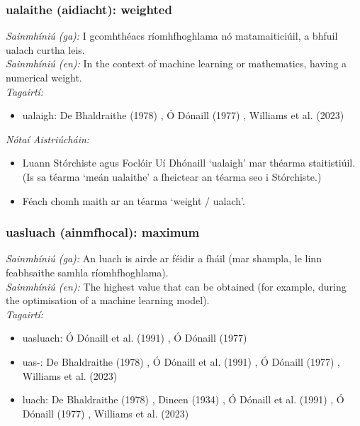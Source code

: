 \documentclass{article}
\begin{document}
\subsubsection*{ualaithe (aidiacht): weighted}
 \noindent \textit{Sainmhíniú (ga):} I gcomhthéacs ríomhfhoghlama nó matamaiticiúil, a bhfuil ualach curtha leis.
\\
 \noindent \textit{Sainmhíniú (en):} In the context of machine learning or mathematics, having a numerical weight.
\\
 \noindent \textit{Tagairtí:}
\begin{itemize}
	\item ualaigh: De Bhaldraithe (1978) \cite{de-bhaldraithe}, Ó Dónaill (1977) \cite{odonaill}, Williams et al. (2023) \cite{storchiste}
\end{itemize}

 \noindent \textit{Nótaí Aistriúcháin:}
\begin{itemize}
	\item Luann Stórchiste agus Foclóir Uí Dhónaill `ualaigh' mar théarma staitistiúil. (Is sa téarma `meán ualaithe' a fheictear an téarma seo i Stórchiste.)
	\item Féach chomh maith ar an téarma `weight / ualach'.
\end{itemize}


\subsubsection*{uasluach (ainmfhocal): maximum}
 \noindent \textit{Sainmhíniú (ga):} An luach is airde ar féidir a fháil (mar shampla, le linn feabhsaithe samhla ríomhfhoghlama).
\\
 \noindent \textit{Sainmhíniú (en):} The highest value that can be obtained (for example, during the optimisation of a machine learning model).
\\
 \noindent \textit{Tagairtí:}
\begin{itemize}
	\item uasluach: Ó Dónaill et al. (1991) \cite{focloir-beag}, Ó Dónaill (1977) \cite{odonaill}
	\item uas-: De Bhaldraithe (1978) \cite{de-bhaldraithe}, Ó Dónaill et al. (1991) \cite{focloir-beag}, Ó Dónaill (1977) \cite{odonaill}, Williams et al. (2023) \cite{storchiste}
	\item luach: De Bhaldraithe (1978) \cite{de-bhaldraithe}, Dineen (1934) \cite{dineen}, Ó Dónaill et al. (1991) \cite{focloir-beag}, Ó Dónaill (1977) \cite{odonaill}, Williams et al. (2023) \cite{storchiste}
\end{itemize}
\end{document}
